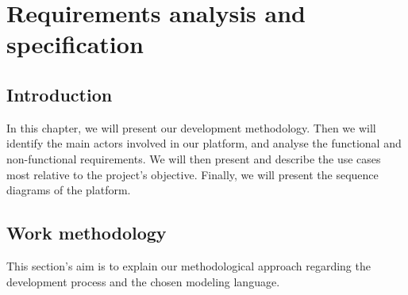 \renewcommand\thechapter{\Roman{chapter}}
\chapter{Requirements analysis and specification}
\newpage
{}

\section*{Introduction}
In this chapter, we will present our development methodology. Then we will identify the main actors involved in our platform, and analyse the functional and non-functional requirements. We will then present and describe the use cases most relative to the project's objective. Finally, we will present the sequence diagrams of the platform.

\section{Work methodology}
This section's aim is to explain our methodological approach regarding the development process and the chosen modeling language.
